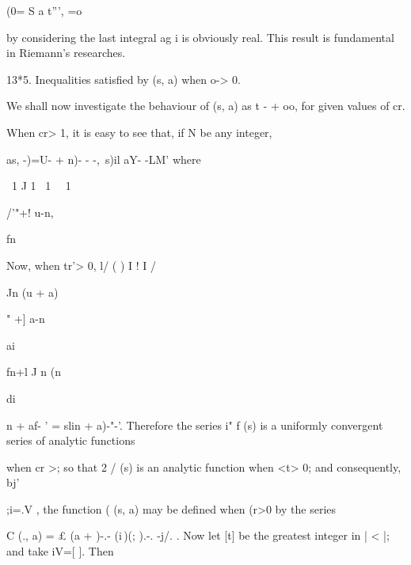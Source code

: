  (0= S a t''', =o

by considering the last integral ag i is obviously real. This result
is fundamental in Riemann's researches.

13*5. Inequalities satisfied by (s, a) when o-> 0.

We shall now investigate the behaviour of (s, a) as t - + oo, for
given values of cr.

When cr> 1, it is easy to see that, if N be any integer,

as, -)=U- + n)- - -,\ s)il aY- -LM' where

\ 1 J 1 \ 1 \ \ 1

/'"+! u-n,

fn

Now, when tr'> 0, l/ ( ) I ! I /

Jn (u + a)

" +] a-n

ai

fn+l J n (n

di

 n + af- ' = slin + a)-"-'. Therefore the series i" f (s) is a
uniformly convergent series of analytic functions

when cr >; so that 2 / (s) is an analytic function when <t> 0; and
consequently, bj'

;i=.V
, the function ( (s, a) may be defined when (r>0 by the series

C (., a) = £ (a + )-.- (i\,)(; ).-. -j/. . Now let [t] be the
greatest integer in | < |; and take iV=[ ]. Then

